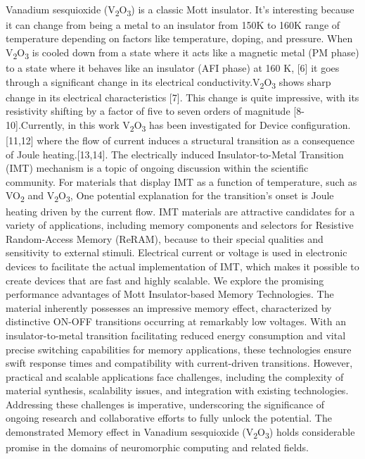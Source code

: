 \documentclass[conference]{IEEEtran}
\begin{document}
\\
Vanadium sesquioxide (V\textsubscript{2}O\textsubscript{3}) is a classic Mott insulator. It’s interesting because it can change from being a metal to an insulator from 150K to 160K range of temperature depending on factors like temperature, doping, and pressure. When V\textsubscript{2}O\textsubscript{3} is cooled down from a state where it acts like a magnetic metal (PM phase) to a state where it behaves like an insulator (AFI phase) at 160 K, [6] it goes through a significant change in its  electrical conductivity.V\textsubscript{2}O\textsubscript{3} shows sharp change in its electrical characteristics [7]. This change is quite impressive, with its resistivity shifting by a factor of five to seven orders of magnitude [8-10].Currently, in this work V\textsubscript{2}O\textsubscript{3} has been investigated for Device configuration.[11,12] where the flow of current induces a structural transition as a consequence of Joule heating.[13,14]. The electrically induced Insulator-to-Metal Transition (IMT) mechanism is a topic of ongoing discussion within the scientific community. For materials that display IMT as a function of temperature, such as VO\textsubscript{2} and V\textsubscript{2}O\textsubscript{3}, One potential explanation for the transition's onset is Joule heating driven by the current flow. IMT materials are attractive candidates for a variety of applications, including memory components and selectors for Resistive Random-Access Memory (ReRAM), because to their special qualities and sensitivity to external stimuli. Electrical current or voltage is used in electronic devices to facilitate the actual implementation of IMT, which makes it possible to create devices that are fast and highly scalable. We explore the promising performance advantages of Mott Insulator-based Memory Technologies. The material inherently possesses an impressive memory effect, characterized by distinctive ON-OFF transitions occurring at remarkably low voltages. With an insulator-to-metal transition facilitating reduced energy consumption and vital precise switching capabilities for memory applications, these technologies ensure swift response times and compatibility with current-driven transitions. However, practical and scalable applications face challenges, including the complexity of material synthesis, scalability issues, and integration with existing technologies. Addressing these challenges is imperative, underscoring the significance of ongoing research and collaborative efforts to fully unlock the potential. The demonstrated Memory effect in Vanadium sesquioxide (V\textsubscript{2}O\textsubscript{3}) holds considerable promise in the domains of neuromorphic computing and related fields.\\
\end{document}
